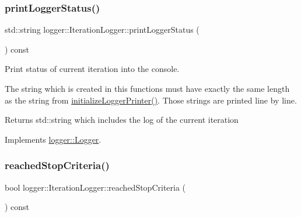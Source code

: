\mbox{\label{classlogger_1_1_iteration_logger_ac3c13bef35391c0408eb196d01b2a286}} 
\subsubsection{\texorpdfstring{print\+Logger\+Status()}{printLoggerStatus()}}
{\footnotesize\ttfamily std\+::string logger\+::\+Iteration\+Logger\+::print\+Logger\+Status (\begin{DoxyParamCaption}{ }\end{DoxyParamCaption}) const\hspace{0.3cm}{\ttfamily [virtual]}}



Print status of current iteration into the console. 

The string which is created in this functions must have exactly the same length as the string from {\ttfamily \mbox{\hyperlink{classlogger_1_1_iteration_logger_ac4ba1eb6419eef2a3c21e9a4323aec1c}{initialize\+Logger\+Printer()}}}. Those strings are printed line by line.

\begin{DoxyReturn}{Returns}
{\ttfamily std\+::string} which includes the log of the current iteration 
\end{DoxyReturn}


Implements \mbox{\hyperlink{classlogger_1_1_logger_abad818a7e8053ca84cb267e883b5e377}{logger\+::\+Logger}}.

\mbox{\label{classlogger_1_1_iteration_logger_a8b66f0d8d2ddb7f15ca14e2b9150ea80}} 
\subsubsection{\texorpdfstring{reached\+Stop\+Criteria()}{reachedStopCriteria()}}
{\footnotesize\ttfamily bool logger\+::\+Iteration\+Logger\+::reached\+Stop\+Criteria (\begin{DoxyParamCaption}{ }\end{DoxyParamCaption}) const\hspace{0.3cm}{\ttfamily [virtual]}}



